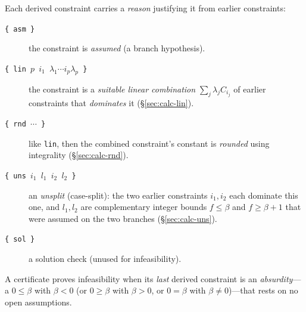 \documentclass[runningheads]{llncs}
\newcommand{\code}[1]{\texttt{#1}}
\begin{document}
Each derived constraint carries a \emph{reason} justifying it from earlier constraints:
\begin{description}
\item[\code{\{ asm \}}] the constraint is \emph{assumed} (a branch hypothesis).
\item[\code{\{ lin $p$ $i_1$ $\lambda_1 \cdots i_p \lambda_p$ \}}] the constraint is a
      \emph{suitable linear combination} $\sum_j \lambda_j C_{i_j}$ of earlier
      constraints that \emph{dominates} it (\S\ref{sec:calc-lin}).
\item[\code{\{ rnd $\cdots$ \}}] like \code{lin}, then the combined constraint's constant
      is \emph{rounded} using integrality (\S\ref{sec:calc-rnd}).
\item[\code{\{ uns $i_1$ $l_1$ $i_2$ $l_2$ \}}] an \emph{unsplit} (case-split): the two
      earlier constraints $i_1,i_2$ each dominate this one, and $l_1,l_2$ are
      complementary integer bounds $f\le\beta$ and $f\ge\beta{+}1$ that were assumed on
      the two branches (\S\ref{sec:calc-uns}).
\item[\code{\{ sol \}}] a solution check (unused for infeasibility).
\end{description}
A certificate proves infeasibility when its \emph{last} derived constraint is an
\emph{absurdity}---a $0\le\beta$ with $\beta<0$ (or $0\ge\beta$ with $\beta>0$, or
$0=\beta$ with $\beta\neq0$)---that rests on no open assumptions.
\end{document}
